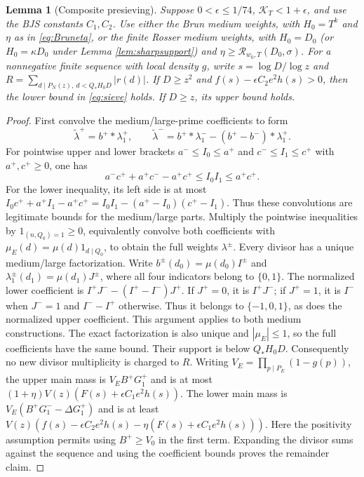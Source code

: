 \documentclass[11pt]{article}
\newtheorem{lemma}[theorem]{Lemma}
\begin{document}
\begin{lemma}[Composite presieving]\label{lem:composite}
Suppose $0<\epsilon\le1/74$, $\mathcal K_T<1+\epsilon$, and use the BJS
constants $C_1,C_2$.
Use either the Brun medium weights, with $H_0=T^k$ and $\eta$ as in
\eqref{eq:Bruneta}, or the finite Rosser medium weights, with
$H_0=D_0$ (or $H_0=\kappa D_0$ under Lemma \ref{lem:sharpsupport})
and $\eta\ge\mathcal R_{w_0,T}(D_0,\sigma)$.
For a nonnegative finite sequence with local density $g$, write
$s=\log D/\log z$ and
$R=\sum_{d\mid P_N(z),\ d<Q_*H_0D}|r(d)|$.
If $D\ge z^2$ and $f(s)-\epsilon C_2e^2h(s)>0$, then the lower
bound in \eqref{eq:sieve} holds. If $D\ge z$, its upper bound holds.
\end{lemma}
\begin{proof}
First convolve the medium/large-prime coefficients to form
\[
\widetilde\lambda^+=b^+*\lambda_1^+,\qquad
\widetilde\lambda^-=b^+*\lambda_1^--(b^+-b^-)*\lambda_1^+.
\]
For pointwise upper and lower brackets $a^-\le I_0\le a^+$
and $c^-\le I_1\le c^+$ with $a^+,c^+\ge0$, one has
\[
a^-c^++a^+c^--a^+c^+\le I_0I_1\le a^+c^+.
\]
For the lower inequality, its left side is at most
$I_0c^++a^+I_1-a^+c^+=I_0I_1-(a^+-I_0)(c^+-I_1)$.
Thus these convolutions are legitimate bounds for the medium/large
parts. Multiply the pointwise inequalities by
$1_{(n,Q_0)=1}\ge0$, equivalently convolve both coefficients with
$\mu_E(d)=\mu(d)1_{d\mid Q_0}$, to obtain the full weights $\lambda^\pm$.
Every divisor has a unique medium/large factorization. Write
$b^\pm(d_0)=\mu(d_0)I^\pm$ and
$\lambda_1^\pm(d_1)=\mu(d_1)J^\pm$, where all four indicators
belong to $\{0,1\}$. The normalized lower coefficient is
$I^+J^--(I^+-I^-)J^+$. If $J^+=0$, it is $I^+J^-$;
if $J^+=1$, it is $I^-$ when $J^-=1$ and $I^--I^+$ otherwise.
Thus it belongs to $\{-1,0,1\}$, as does the normalized upper
coefficient. This argument applies to both medium constructions.
The exact factorization is also unique and $|\mu_E|\le1$, so the full
coefficients have the same bound. Their support is below $Q_*H_0D$.
Consequently no new divisor multiplicity is charged
to $R$.
Writing $V_E=\prod_{p\mid P_E}(1-g(p))$, the upper main mass is
$V_EB^+G_1^+$ and is at most
$(1+\eta)V(z)(F(s)+\epsilon C_1e^2h(s))$.
The lower main mass is $V_E(B^+G_1^--\Delta G_1^+)$ and is at least
$V(z)(f(s)-\epsilon C_2e^2h(s)
-\eta(F(s)+\epsilon C_1e^2h(s)))$.
Here the positivity assumption permits using $B^+\ge V_0$ in
the first term. Expanding the divisor sums against the sequence
and using the coefficient bounds proves the remainder claim.
\end{proof}
\end{document}
